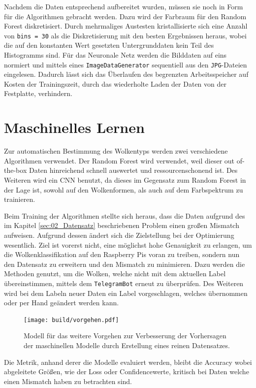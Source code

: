 Nachdem die Daten entsprechend aufbereitet wurden, müssen sie noch in Form für
die Algorithmen gebracht werden. 
Dazu wird der Farbraum für den Random Forest diskretisiert.
Durch mehrmaliges Austesten kristallisierte sich eine Anzahl von 
\texttt{bins = 30} als die Diskretisierung mit den besten Ergebnissen heraus,
wobei die auf den konstanten Wert gesetzten Untergrunddaten kein Teil des
Histogramms sind.
Für das Neuronale Netz werden die Bilddaten auf eins normiert und mittels 
eines \texttt{ImageDataGenerator} sequentiell aus den \texttt{JPG}-Dateien 
eingelesen. 
Dadurch lässt sich das Überlaufen des begrenzten Arbeitsspeicher auf Kosten 
der Trainingszeit, durch das wiederholte Laden der Daten von der Festplatte,
verhindern.


\section{Maschinelles Lernen}

Zur automatischen Bestimmung des Wolkentyps werden zwei verschiedene 
Algorithmen verwendet. 
Der Random Forest wird verwendet, weil dieser out of-the-box Daten 
hinreichend schnell auswertet und ressourcenschonend ist.
Des Weiteren wird ein CNN benutzt, da dieses im Gegensatz zum Random Forest in 
der Lage ist, sowohl auf den Wolkenformen, als auch auf dem 
Farbspektrum zu trainieren. 

Beim Training der Algorithmen stellte sich heraus, dass die Daten aufgrund des im
Kapitel \ref{sec:02_Datensatz} beschriebenen Problem einen großen Mismatch 
aufweisen. 
Aufgrund dessen ändert sich die Zielstellung bei der Optimierung wesentlich.
Ziel ist vorerst nicht, eine möglichst hohe Genauigkeit zu erlangen,
um die Wolkenklassifikation auf den Raspberry Pis voran zu treiben,
sondern nun den Datensatz zu erweitern und den Mismatch zu 
minimieren.
Dazu werden die Methoden genutzt, um die Wolken, welche nicht mit dem 
aktuellen Label übereinstimmen, mittels dem \texttt{TelegramBot} erneut zu überprüfen.
Des Weiteren wird bei dem Labeln neuer Daten ein Label vorgeschlagen,
welches übernommen oder per Hand geändert werden kann.
\begin{figure}
		\centering
		\texttt{[image: build/vorgehen.pdf]}
		\caption{Modell für das weitere Vorgehen zur Verbesserung der Vorhersagen
		der maschinellen Modelle durch Erstellung eines reinen Datensatzes.}
		\label{fig:}
\end{figure}

Die Metrik, anhand derer die Modelle evaluiert werden, bleibt die 
Accuracy wobei abgeleitete Größen, wie der Loss oder Confidencewerte, kritisch bei Daten welche einen Mismatch haben zu 
betrachten sind.

